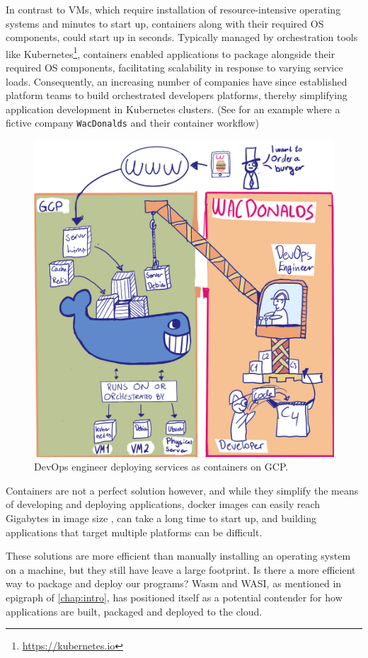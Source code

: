 \documentclass[
  table]{report}
\begin{document}
In contrast to VMs, which require installation of resource-intensive
operating systems and minutes to start up, containers along with their
required OS components, could start up in seconds. Typically managed by
orchestration tools like Kubernetes\footnote{\url{https://kubernetes.io}},
containers enabled applications to package alongside their required OS
components, facilitating scalability in response to varying service
loads. Consequently, an increasing number of companies have since
established platform teams to build orchestrated developers platforms,
thereby simplifying application development in Kubernetes clusters. (See
 for an example where a fictive company
\texttt{WacDonalds} and their container workflow)

\begin{figure}[H]
\centering
  \includegraphics[width=0.8\columnwidth]{assets/2.3-second-wave-2.png}
  \caption{DevOps engineer deploying services as containers on \ac{GCP}.}
  \label{fig:docker}
\end{figure}

Containers are not a perfect solution however, and while they simplify
the means of developing and deploying applications, docker images can
easily reach Gigabytes in image size \citep{durieux2023}, can take a
long time to start up, and building applications that target multiple
platforms can be difficult.

These solutions are more efficient than manually installing an operating
system on a machine, but they still have leave a large footprint. Is
there a more efficient way to package and deploy our programs? \ac{Wasm}
and \ac{WASI}, as mentioned in epigraph of \cref{chap:intro}, has
positioned itself as a potential contender for how applications are
built, packaged and deployed to the cloud.
\end{document}
